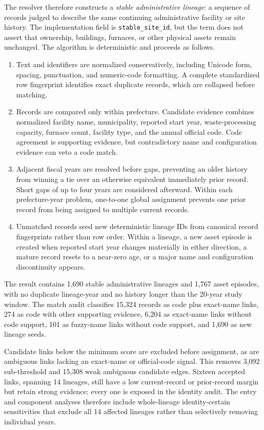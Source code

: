 \documentclass[11pt,letterpaper]{article}
\begin{document}
The resolver therefore constructs a \emph{stable administrative lineage}: a
sequence of records judged to describe the same continuing administrative
facility or site history. The implementation field is
\texttt{stable\_site\_id}, but the term does not assert that ownership,
buildings, furnaces, or other physical assets remain unchanged. The algorithm
is deterministic and proceeds as follows.

\begin{enumerate}
\item Text and identifiers are normalized conservatively, including Unicode
form, spacing, punctuation, and numeric-code formatting. A complete standardized
row fingerprint identifies exact duplicate records, which are collapsed before
matching.
\item Records are compared only within prefecture. Candidate evidence combines
normalized facility name, municipality, reported start year, waste-processing
capacity, furnace count, facility type, and the annual official code. Code
agreement is supporting evidence, but contradictory name and configuration
evidence can veto a code match.
\item Adjacent fiscal years are resolved before gaps, preventing an older
history from winning a tie over an otherwise equivalent immediately prior
record. Short gaps of up to four years are considered afterward. Within each
prefecture-year problem, one-to-one global assignment prevents one prior record
from being assigned to multiple current records.
\item Unmatched records seed new deterministic lineage IDs from canonical record
fingerprints rather than row order. Within a lineage, a new asset episode is
created when reported start year changes materially in either direction, a
mature record resets to a near-zero age, or a major name and configuration
discontinuity appears.
\end{enumerate}

The result contains 1,690 stable administrative lineages and 1,767 asset
episodes, with no duplicate lineage-year and no history longer than the 20-year
study window. The match audit classifies 15,324 records as code plus exact-name
links, 274 as code with other supporting evidence, 6,204 as exact-name links
without code support, 101 as fuzzy-name links without code support, and 1,690 as
new lineage seeds.

Candidate links below the minimum score are excluded before assignment, as are
ambiguous links lacking an exact-name or official-code signal. This removes
3,092 sub-threshold and 15,308 weak ambiguous candidate edges. Sixteen accepted
links, spanning 14 lineages, still have a low current-record or prior-record
margin but retain strong evidence; every one is exposed in the identity audit.
The entry and component analyses therefore include whole-lineage
identity-certain sensitivities that exclude all 14 affected lineages rather
than selectively removing individual years.
\end{document}
